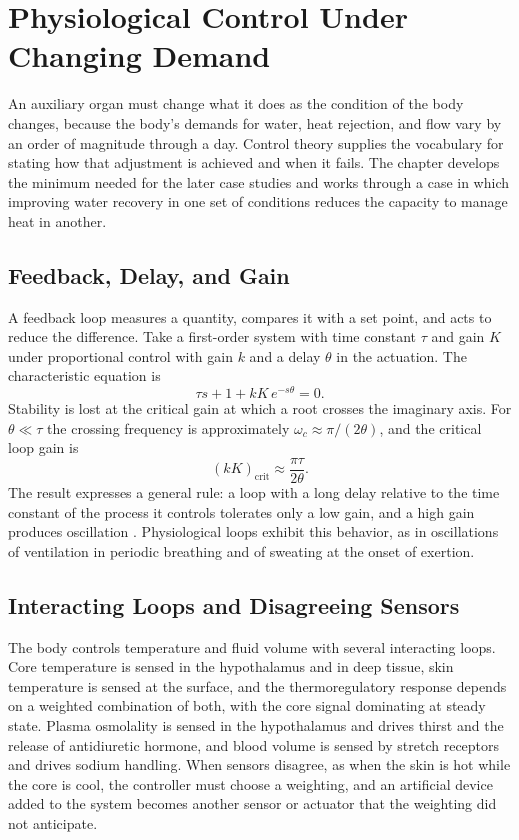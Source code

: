 \documentclass[11pt,openany]{book}
\theoremstyle{definition}
\theoremstyle{remark}
\begin{document}
\chapter{Physiological Control Under Changing Demand}
\label{ch:control}

An auxiliary organ must change what it does as the condition of the body changes, because the body's demands for water, heat rejection, and flow vary by an order of magnitude through a day. Control theory supplies the vocabulary for stating how that adjustment is achieved and when it fails. The chapter develops the minimum needed for the later case studies and works through a case in which improving water recovery in one set of conditions reduces the capacity to manage heat in another.

\section{Feedback, Delay, and Gain}

A feedback loop measures a quantity, compares it with a set point, and acts to reduce the difference. Take a first-order system with time constant $\tau$ and gain $K$ under proportional control with gain $k$ and a delay $\theta$ in the actuation. The characteristic equation is
\begin{equation}
\tau s+1+kK\,e^{-s\theta}=0.
\label{eq:char}
\end{equation}
Stability is lost at the critical gain at which a root crosses the imaginary axis. For $\theta\ll\tau$ the crossing frequency is approximately $\omega_c\approx\pi/(2\theta)$, and the critical loop gain is
\begin{equation}
(kK)_{\mathrm{crit}}\approx\frac{\pi\tau}{2\theta}.
\label{eq:critgain}
\end{equation}
The result expresses a general rule: a loop with a long delay relative to the time constant of the process it controls tolerates only a low gain, and a high gain produces oscillation \cite{astrom2008}. Physiological loops exhibit this behavior, as in oscillations of ventilation in periodic breathing and of sweating at the onset of exertion.

\section{Interacting Loops and Disagreeing Sensors}

The body controls temperature and fluid volume with several interacting loops. Core temperature is sensed in the hypothalamus and in deep tissue, skin temperature is sensed at the surface, and the thermoregulatory response depends on a weighted combination of both, with the core signal dominating at steady state. Plasma osmolality is sensed in the hypothalamus and drives thirst and the release of antidiuretic hormone, and blood volume is sensed by stretch receptors and drives sodium handling. When sensors disagree, as when the skin is hot while the core is cool, the controller must choose a weighting, and an artificial device added to the system becomes another sensor or actuator that the weighting did not anticipate.
\end{document}
